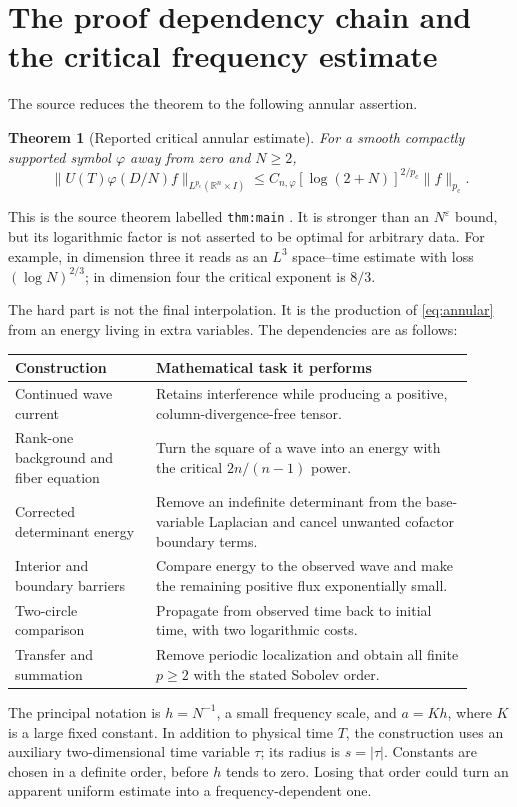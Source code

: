 \documentclass[11pt,a4paper]{article}
\numberwithin{equation}{section}
\newtheorem{theorem}{Theorem}[section]
\theoremstyle{definition}
\theoremstyle{remark}
\newcommand{\R}{\mathbb R}
\newcommand{\eps}{\varepsilon}
\newcommand{\pc}{p_{\mathrm c}}
\begin{document}
\section{The proof dependency chain and the critical frequency estimate}
\label{sec:roadmap}
The source reduces the theorem to the following annular assertion.
\begin{theorem}[Reported critical annular estimate]\label{thm:annular}
For a smooth compactly supported symbol $\varphi$ away from zero and $N\ge2$,
\begin{equation}\label{eq:annular}
 \|U(T)\varphi(D/N)f\|_{L^{\pc}(\R^n\times I)}
 \le C_{n,\varphi}[\log(2+N)]^{2/\pc}\|f\|_{\pc}.
\end{equation}
\end{theorem}
This is the source theorem labelled \texttt{thm:main} \cite{intro}. It is
stronger than an $N^\eps$ bound, but its logarithmic factor is not asserted to
be optimal for arbitrary data. For example, in dimension three it reads as an
$L^3$ space--time estimate with loss $(\log N)^{2/3}$; in dimension four the
critical exponent is $8/3$.

The hard part is not the final interpolation. It is the production of
\eqref{eq:annular} from an energy living in extra variables. The dependencies
are as follows:
\begin{center}
\begin{tabular}{p{0.28\linewidth}p{0.63\linewidth}}
\toprule
Construction & Mathematical task it performs\\
\midrule
Continued wave current & Retains interference while producing a positive,
column-divergence-free tensor.\\
Rank-one background and fiber equation & Turn the square of a wave into an
energy with the critical $2n/(n-1)$ power.\\
Corrected determinant energy & Remove an indefinite determinant from the
base-variable Laplacian and cancel unwanted cofactor boundary terms.\\
Interior and boundary barriers & Compare energy to the observed wave and
make the remaining positive flux exponentially small.\\
Two-circle comparison & Propagate from observed time back to initial time,
with two logarithmic costs.\\
Transfer and summation & Remove periodic localization and obtain all finite
$p\ge2$ with the stated Sobolev order.\\
\bottomrule
\end{tabular}
\end{center}
The principal notation is $h=N^{-1}$, a small frequency scale, and $a=Kh$,
where $K$ is a large fixed constant. In addition to physical time $T$, the
construction uses an auxiliary two-dimensional time variable $\tau$; its radius
is $s=|\tau|$. Constants are chosen in a definite order, before $h$ tends to
zero. Losing that order could turn an apparent uniform estimate into a
frequency-dependent one.
\end{document}
